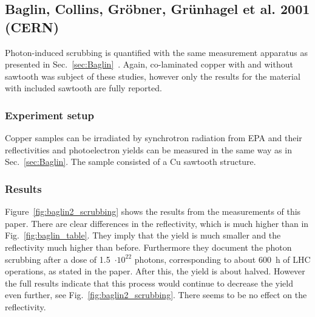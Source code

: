 \subsection{Baglin, Collins, Gröbner, Grünhagel et al. 2001 (CERN)}
\label{sec:Baglin2}
Photon-induced scrubbing is quantified with the same measurement apparatus as presented in Sec.~\ref{sec:Baglin}~\cite{baglin2}.
Again, co-laminated copper with and without sawtooth was subject of these studies, however only the results for the material with included sawtooth are fully reported.

\subsubsection{Experiment setup}
Copper samples can be irradiated by synchrotron radiation from EPA and their reflectivities and photoelectron yields can be measured in the same way as in Sec.~\ref{sec:Baglin}.
The sample consisted of a Cu sawtooth structure.


\subsubsection{Results}

Figure~\ref{fig:baglin2_scrubbing} shows the results from the measurements of this paper.
There are clear differences in the reflectivity, which is much higher than in Fig.~\ref{fig:baglin_table}.
They imply that the yield is much smaller and the reflectivity much higher than before.
Furthermore they document the photon scrubbing after a dose of 1.5~$\cdot10^{22}$ photons, corresponding to about 600~h of LHC operations, as stated in the paper.
After this, the yield is about halved.
However the full results indicate that this process would continue to decrease the yield even further, see Fig.~\ref{fig:baglin2_scrubbing}.
There seems to be no effect on the reflectivity.

